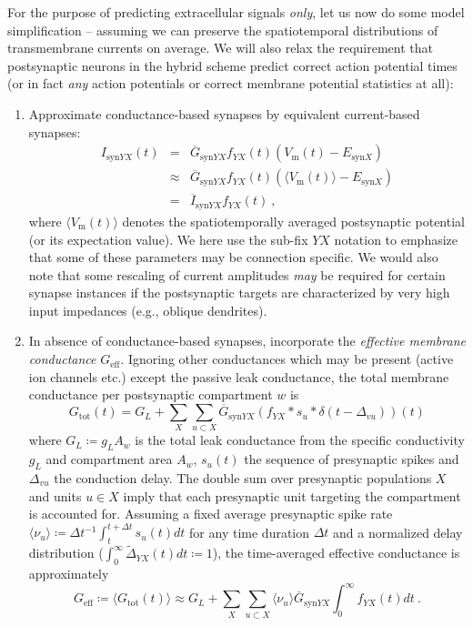 For the purpose of predicting extracellular signals \emph{only},
let us now do some model simplification -- assuming we can preserve the spatiotemporal distributions of transmembrane currents on average.
We will also relax the requirement that postsynaptic neurons in the hybrid scheme predict correct action potential times (or in fact \emph{any} action potentials or correct membrane potential statistics at all):
\begin{enumerate}
\item Approximate conductance-based synapses by equivalent current-based synapses:
\begin{eqnarray}
I_{\mathrm{syn}YX}(t)
	&=& \overline{G}_{\mathrm{syn}YX}f_{YX}(t)\left(V_\mathrm{m}(t) - E_{\mathrm{syn}X}\right) \\
	&\approx& \overline{G}_{\mathrm{syn}YX}f_{YX}(t)\left(\langle V_\mathrm{m}(t) \rangle - E_{\mathrm{syn}X}\right) \\
	&=& \overline{I}_{\mathrm{syn}YX}f_{YX}(t)~,
\end{eqnarray}
where $\langle V_\mathrm{m}(t) \rangle$ denotes the spatiotemporally averaged postsynaptic potential (or its expectation value).
We here use the sub-fix $YX$ notation to emphasize that some of these parameters may be connection specific.
We would also note that some rescaling of current amplitudes \emph{may} be required for certain synapse instances if the postsynaptic targets are characterized by very high input impedances (e.g., oblique dendrites).

\item In absence of conductance-based synapses, incorporate the \emph{effective membrane conductance} $G_\mathrm{eff}$.
Ignoring other conductances which may be present (active ion channels etc.) except the passive leak conductance,
the total membrane conductance per postsynaptic compartment $w$ is
\begin{equation}
G_{\mathrm{tot}}(t) = G_L + \sum_X \sum_{u \subset X} \overline{G}_{\mathrm{syn}YX} \left( f_{YX} \ast s_u \ast \delta(t-\Delta_{vu}) \right)(t)
\end{equation}
where $G_L \coloneq g_L A_w$ is the total leak conductance from the specific conductivity $g_L$ and compartment area $A_w$,
$s_u(t)$ the sequence of presynaptic spikes
and $\Delta_{vu}$ the conduction delay.
The double sum over presynaptic populations $X$ and units $u \in X$ imply that each presynaptic unit targeting the compartment is accounted for.
Assuming a fixed average presynaptic spike rate $\langle \nu_u \rangle \coloneq \Delta t^{-1} \int_t^{t+\Delta t} s_u(t) dt$ for any time duration $\Delta t$ 
and a normalized delay distribution ($\int_0^\infty \widetilde{\Delta}_{YX}(t) dt \coloneq 1$),
the time-averaged effective conductance is approximately
\begin{equation}
G_\mathrm{eff} \coloneq \langle G_\mathrm{tot}(t) \rangle \approx G_L + \sum_X \sum_{u \subset X} \langle \nu_u \rangle \overline{G}_{\mathrm{syn}YX} \int_0^\infty f_{YX}(t) dt ~.
\end{equation}


\end{enumerate}

